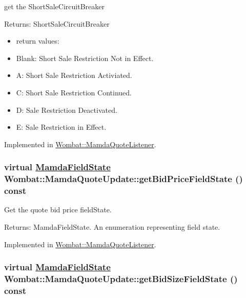 get the Short\-Sale\-Circuit\-Breaker 

\begin{Desc}
\item[Returns:]Short\-Sale\-Circuit\-Breaker \begin{itemize}
\item return values: \item Blank: Short Sale Restriction Not in Effect. \item A: Short Sale Restriction Activiated. \item C: Short Sale Restriction Continued. \item D: Sale Restriction Deactivated. \item E: Sale Restriction in Effect. \end{itemize}
\end{Desc}


Implemented in \hyperlink{classWombat_1_1MamdaQuoteListener_2638f27bca3f6fa7c673e5b6924e3842}{Wombat::Mamda\-Quote\-Listener}.\hypertarget{classWombat_1_1MamdaQuoteUpdate_6a37beceb454a5c413d322008f9b77a9}{
\subsubsection[getBidPriceFieldState]{\setlength{\rightskip}{0pt plus 5cm}virtual \hyperlink{namespaceWombat_93aac974f2ab713554fd12a1fa3b7d2a}{Mamda\-Field\-State} Wombat::Mamda\-Quote\-Update::get\-Bid\-Price\-Field\-State () const}}
\label{classWombat_1_1MamdaQuoteUpdate_6a37beceb454a5c413d322008f9b77a9}


Get the quote bid price field\-State. 

\begin{Desc}
\item[Returns:]Mamda\-Field\-State. An enumeration representing field state. \end{Desc}


Implemented in \hyperlink{classWombat_1_1MamdaQuoteListener_edb910c741c98a43134d0abcb325079e}{Wombat::Mamda\-Quote\-Listener}.\hypertarget{classWombat_1_1MamdaQuoteUpdate_900615e9e035465932a232bf375cd662}{
\subsubsection[getBidSizeFieldState]{\setlength{\rightskip}{0pt plus 5cm}virtual \hyperlink{namespaceWombat_93aac974f2ab713554fd12a1fa3b7d2a}{Mamda\-Field\-State} Wombat::Mamda\-Quote\-Update::get\-Bid\-Size\-Field\-State () const}}
\label{classWombat_1_1MamdaQuoteUpdate_900615e9e035465932a232bf375cd662}


